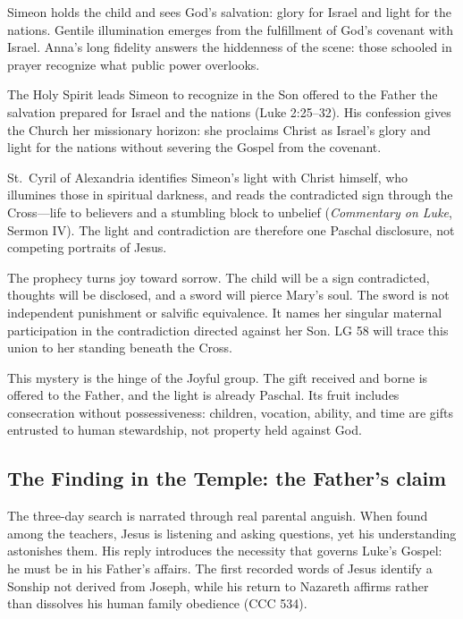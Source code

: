 Simeon holds the child and sees God's salvation: glory for Israel and light for the nations. Gentile illumination emerges from the fulfillment of God's covenant with Israel. Anna's long fidelity answers the hiddenness of the scene: those schooled in prayer recognize what public power overlooks.

The Holy Spirit leads Simeon to recognize in the Son offered to the Father the salvation prepared for Israel and the nations (Luke 2:25--32). His confession gives the Church her missionary horizon: she proclaims Christ as Israel's glory and light for the nations without severing the Gospel from the covenant.

St.~Cyril of Alexandria identifies Simeon's light with Christ himself, who illumines those in spiritual darkness, and reads the contradicted sign through the Cross---life to believers and a stumbling block to unbelief (\emph{Commentary on Luke}, Sermon IV). The light and contradiction are therefore one Paschal disclosure, not competing portraits of Jesus.

The prophecy turns joy toward sorrow. The child will be a sign contradicted, thoughts will be disclosed, and a sword will pierce Mary's soul. The sword is not independent punishment or salvific equivalence. It names her singular maternal participation in the contradiction directed against her Son. LG 58 will trace this union to her standing beneath the Cross.

This mystery is the hinge of the Joyful group. The gift received and borne is offered to the Father, and the light is already Paschal. Its fruit includes consecration without possessiveness: children, vocation, ability, and time are gifts entrusted to human stewardship, not property held against God.

\subsection{The Finding in the Temple: the Father's claim}


The three-day search is narrated through real parental anguish. When found among the teachers, Jesus is listening and asking questions, yet his understanding astonishes them. His reply introduces the necessity that governs Luke's Gospel: he must be in his Father's affairs. The first recorded words of Jesus identify a Sonship not derived from Joseph, while his return to Nazareth affirms rather than dissolves his human family obedience (CCC 534).

